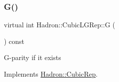 \mbox{\label{structHadron_1_1CubicLGRep_ace26f7b2d55e3a668a14cb9026da5231}} 
\subsubsection{\texorpdfstring{G()}{G()}\hspace{0.1cm}{\footnotesize\ttfamily [1/2]}}
{\footnotesize\ttfamily virtual int Hadron\+::\+Cubic\+L\+G\+Rep\+::G (\begin{DoxyParamCaption}{ }\end{DoxyParamCaption}) const\hspace{0.3cm}{\ttfamily [pure virtual]}}

G-\/parity if it exists 

Implements \mbox{\hyperlink{structHadron_1_1CubicRep_a52104e43266d1614c00bbd1c3b395458}{Hadron\+::\+Cubic\+Rep}}.



